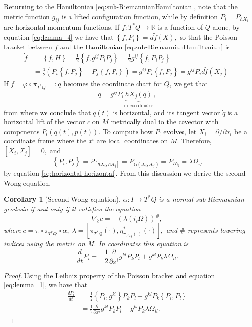 \documentclass[12pt, letterpaper, reqno]{amsart}
\theoremstyle{definition}
\theoremstyle{plain}
\newtheorem{cor}{Corollary}
\theoremstyle{remark}
\begin{document}
Returning to the Hamiltonian \eqref{eq:sub-RiemannianHamiltonian}, note that the metric function $ g_{ij} $ is a lifted configuration function, while by definition $ P_i=P_{hX_i} $ are horizontal momentum functions. If $ f: T^*Q \rightarrow \mathbb{R} $ is a function of $ Q $ alone, by equation \eqref{eq:lemma_4} we have that $ \left\{ f, P_i \right\} = d\tilde f(X), $ so that the Poisson bracket between $ f $ and the Hamiltonian \eqref{eq:sub-RiemannianHamiltonian} is 
\begin{align*}
	\dot{f} &= \left\{ f, H \right\} = \frac{1}{2} \left\{ f, g^{ij}P_iP_j \right\} = \frac{1}{2} g^{ij} \left\{ f, P_iP_j \right\} \\&= \frac{1}{2} \left( P_i \left\{ f,P_j \right\} +P_j \left\{ f,P_i \right\}  \right) = g^{ij}P_i \left\{ f,P_j \right\} = g^{ij} P_i d\tilde f( X_j). 
\end{align*}
If $ f= \varphi\circ\pi_{T^*Q}=:q $ becomes the coordinate chart for $ Q $, we get that 
$$ \dot{q} = g^{ij}P_i \underbrace{hX_j(q)}_{\text{in coordinates}}, $$ 
from where we conclude that $ q(t) $ is horizontal, and its tangent vector $ \dot{q} $ is a horizontal lift of the vector $ \dot{c} $ on $ M $ metrically dual to the covector with components $ P_i(q(t), p(t)). $ To compute how $ P_i $ evolves, let $ X_i=\partial/\partial x_i $ be a coordinate frame where the $ x^i $ are local coordinates on $ M. $  Therefore, $ [X_i,X_j]=0, $ and
$$ \left\{ P_i,P_j \right\} = P_{[hX_i, hX_j]}= P_{\Omega(X_i, X_j)} = P_{\Omega_{ij}} = \lambda \Omega_{ij} $$ 
by equation \eqref{eq:horizontal-horizontal}. From this discussion we derive the second Wong equation.

\begin{cor}[Second Wong equation]\label{cor:swe}
	$ \alpha: I \rightarrow T^*Q $ is a normal sub-Riemannian geodesic if and only if it satisfies the equation
	$$ \nabla_{\dot{c}}\dot{c} = -( \lambda(i_{\dot{c}}\Omega))^{\#}, $$ 
	where $ c = \pi\circ\pi_{T^*Q}\circ\alpha, $ $\lambda = [\pi_{T^*Q}(\cdot), \eta^*_{\pi_{T^*Q}(\cdot)}(\cdot)], $ and $ \# $ represents lowering indices using the metric on $ M. $ In coordinates this equation is
	$$ \frac{d}{dt} P_i = - \frac{1}{2} \frac{\partial }{\partial x^i} g^{kl}P_kP_l + g^{kl}P_k \lambda \Omega_{il}. $$ 
\end{cor}
\begin{proof}
	Using the Leibniz property of the Poisson bracket and equation \eqref{eq:lemma_1}, we have that
	\begin{align*}
		\frac{d P_i}{dt} &= \frac{1}{2} \left\{ P_i, g^{kl} \right\} P_kP_l+ g^{kl} P_k \left\{ P_i, P_l \right\} \\&= \frac{1}{2} \frac{\partial }{\partial x^i} g^{kl} P_k P_l + g^{kl} P_k\lambda \Omega_{il}.
	\end{align*}
\end{proof}
 
\end{document}

